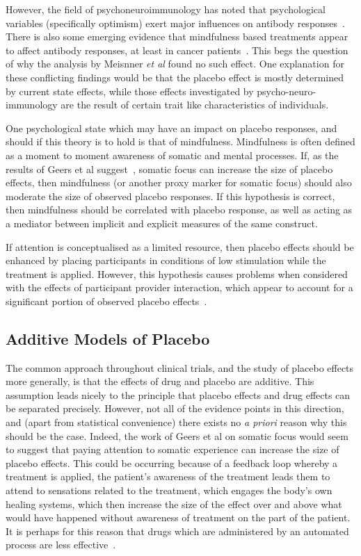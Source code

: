 However, the field of psychoneuroimmunology has noted that psychological variables (specifically optimism) exert major influences on antibody responses~\cite{Carver2010}. There is also some emerging evidence that mindfulness based treatments appear to affect antibody responses, at least in cancer patients~\cite{Ledesma2009}. This begs the question of why the analysis by Meisnner \textit{et al} found no such effect. One explanation for these conflicting findings would be that the placebo effect is mostly determined by current state effects, while those effects investigated by psycho-neuro-immunology are the result of certain trait like characteristics of individuals.  

One psychological state which may have an impact on placebo responses, and should if this theory is to hold is that of mindfulness. Mindfulness is often defined as a moment to moment awareness of somatic and mental processes. If, as the results of Geers et al suggest~\cite{Geers2006}, somatic focus can increase the size of placebo effects, then mindfulness (or another proxy marker for somatic focus) should also moderate the size of observed placebo responses. If this hypothesis is correct, then mindfulness should be correlated with placebo response, as well as acting as a mediator between implicit and explicit measures of the same construct. 

If attention is conceptualised as a limited resource, then placebo effects should be enhanced by placing participants in conditions of low stimulation while the treatment is applied. However, this hypothesis causes problems when  considered with the effects of participant provider interaction, which appear to account for a significant portion of observed placebo effects~\cite{DiBlasi2001,Kaptchuk2008}. 

\subsection{Additive Models of Placebo}

The common approach throughout clinical trials, and the study of placebo effects more generally, is that the effects of drug and placebo are additive. This assumption leads nicely to the principle that placebo effects and drug effects can be separated precisely. However, not all of the evidence points in this direction, and (apart from statistical convenience) there exists no 
{\it a priori\/} reason why this should be the case. Indeed, the work of Geers et al on somatic focus would seem to suggest that paying attention to somatic experience can increase the size of placebo effects. This could be occurring because of a feedback loop whereby a treatment is applied, the patient's awareness of the treatment leads them to attend to sensations related to the treatment, which engages the body's own healing systems, which then increase the size of the effect over and above what would have happened without awareness of treatment on the part of the patient. It is perhaps for this reason that drugs which are administered by an automated process are less effective~\cite{benedetti2003}. 

